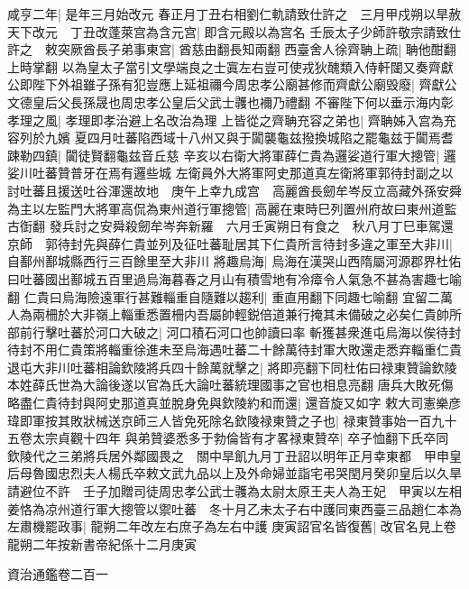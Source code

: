 咸亨二年|{
	是年三月始改元}
春正月丁丑右相劉仁軌請致仕許之　三月甲戍朔以旱赦天下改元　丁丑改蓬萊宫為含元宫|{
	即含元殿以為宫名}
壬辰太子少師許敬宗請致仕許之　敕突厥酋長子弟事東宫|{
	酋慈由翻長知兩翻}
西臺舍人徐齊聃上疏|{
	聃他酣翻上時掌翻}
以為皇太子當引文學端良之士寘左右豈可使戎狄醜類入侍軒闥又奏齊獻公即陛下外祖雖子孫有犯豈應上延祖禰今周忠孝公廟甚修而齊獻公廟毁廢|{
	齊獻公文德皇后父長孫晟也周忠孝公皇后父武士彠也襧乃禮翻}
不審陛下何以垂示海内彰孝理之風|{
	孝理即孝治避上名改治為理}
上皆從之齊聃充容之弟也|{
	齊聃姊入宫為充容列於九嬪}
夏四月吐蕃陷西域十八州又與于闐襲龜兹撥換城陷之罷龜兹于闐焉耆踈勒四鎮|{
	闐徒賢翻龜兹音丘慈}
辛亥以右衛大將軍薛仁貴為邏娑道行軍大摠管|{
	邏娑川吐蕃贊普牙在焉有邏些城}
左衛員外大將軍阿史那道真左衛將軍郭待封副之以討吐蕃且援送吐谷渾還故地　庚午上幸九成宫　高麗酋長劒牟岑反立高藏外孫安舜為主以左監門大將軍高侃為東州道行軍摠管|{
	高麗在東時巳列置州府故曰東州道監古衘翻}
發兵討之安舜殺劒牟岑奔新羅　六月壬寅朔日有食之　秋八月丁巳車駕還京師　郭待封先與薛仁貴並列及征吐蕃耻居其下仁貴所言待封多違之軍至大非川|{
	自鄯州鄯城縣西行三百餘里至大非川}
將趣烏海|{
	烏海在漢哭山西隋屬河源郡界杜佑曰吐蕃國出鄯城五百里過烏海暮春之月山有積雪地有冷瘴令人氣急不甚為害趣七喻翻}
仁貴曰烏海險遠軍行甚難輜重自隨難以趨利|{
	重直用翻下同趣七喻翻}
宜留二萬人為兩柵於大非嶺上輜重悉置柵内吾屬帥輕鋭倍道兼行掩其未備破之必矣仁貴帥所部前行擊吐蕃於河口大破之|{
	河口積石河口也帥讀曰率}
斬獲甚衆進屯烏海以俟待封待封不用仁貴策將輜重徐進未至烏海遇吐蕃二十餘萬待封軍大敗還走悉弃輜重仁貴退屯大非川吐蕃相論欽陵將兵四十餘萬就擊之|{
	將即亮翻下同杜佑曰禄東贊論欽陵本姓薛氏世為大論後遂以官為氏大論吐蕃統理國事之官也相息亮翻}
唐兵大敗死傷略盡仁貴待封與阿史那道真並脫身免與欽陵約和而還|{
	還音旋又如字}
敕大司憲樂彦瑋即軍按其敗狀械送京師三人皆免死除名欽陵禄東贊之子也|{
	禄東贊事始一百九十五卷太宗貞觀十四年}
與弟贊婆悉多于勃倫皆有才畧禄東贊卒|{
	卒子恤翻下氏卒同}
欽陵代之三弟將兵居外鄰國畏之　關中旱飢九月丁丑詔以明年正月幸東都　甲申皇后母魯國忠烈夫人楊氏卒敕文武九品以上及外命婦並詣宅弔哭閏月癸卯皇后以久旱請避位不許　壬子加贈司徒周忠孝公武士彠為太尉太原王夫人為王妃　甲寅以左相姜恪為凉州道行軍大摠管以禦吐蕃　冬十月乙未太子右中護同東西臺三品趙仁本為左肅機罷政事|{
	龍朔二年改左右庶子為左右中護}
庚寅詔官名皆復舊|{
	改官名見上卷龍朔二年按新書帝紀係十二月庚寅}


資治通鑑卷二百一
